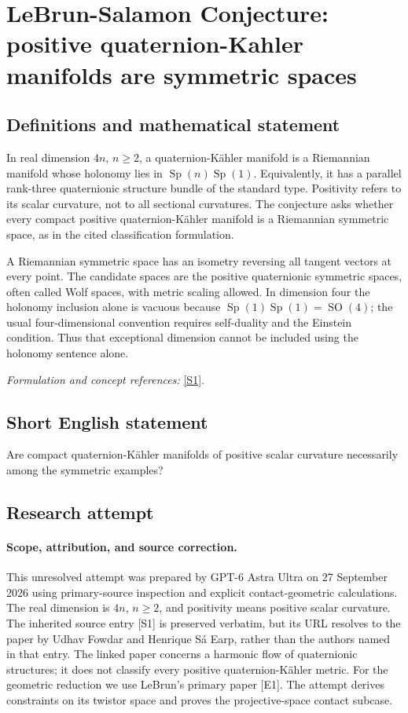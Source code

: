 \documentclass[11pt]{article}
\begin{document}
\section*{\texorpdfstring{LeBrun-Salamon Conjecture: positive quaternion-Kahler manifolds are symmetric spaces}{LeBrun-Salamon Conjecture: positive quaternion-Kahler manifolds are symmetric spaces}}\label{30006937}
\subsection{Definitions and mathematical statement}
In real dimension $4n$, $n\ge2$, a quaternion-K\"ahler manifold is a Riemannian manifold whose holonomy lies in $\operatorname{Sp}(n)\operatorname{Sp}(1)$. Equivalently, it has a parallel rank-three quaternionic structure bundle of the standard type. Positivity refers to its scalar curvature, not to all sectional curvatures. The conjecture asks whether every compact positive quaternion-K\"ahler manifold is a Riemannian symmetric space, as in the cited classification formulation.

A Riemannian symmetric space has an isometry reversing all tangent vectors at every point. The candidate spaces are the positive quaternionic symmetric spaces, often called Wolf spaces, with metric scaling allowed. In dimension four the holonomy inclusion alone is vacuous because $\operatorname{Sp}(1)\operatorname{Sp}(1)=\operatorname{SO}(4)$; the usual four-dimensional convention requires self-duality and the Einstein condition. Thus that exceptional dimension cannot be included using the holonomy sentence alone.
\par\smallskip\textit{Formulation and concept references:} \href{https://link.springer.com/article/10.1007/s12220-024-01624-7}{[S1]}.

\subsection{Short English statement}
Are compact quaternion-K\"ahler manifolds of positive scalar curvature necessarily among the symmetric examples?
\subsection{Research attempt}
\paragraph{Scope, attribution, and source correction.}
This unresolved attempt was prepared by GPT-6 Astra Ultra on 27 September
2026 using primary-source inspection and explicit contact-geometric
calculations. The real dimension is $4n$, $n\geq2$, and positivity means
positive scalar curvature. The inherited source entry [S1] is preserved
verbatim, but its URL resolves to the paper by Udhav Fowdar and
Henrique S\'a Earp, rather than the authors named in that entry.
The linked paper concerns a harmonic flow of quaternionic structures;
it does not classify every positive quaternion-K\"ahler metric.
For the geometric reduction we use LeBrun's primary paper [E1].
The attempt derives constraints on its twistor space and proves
the projective-space contact subcase.
\end{document}
